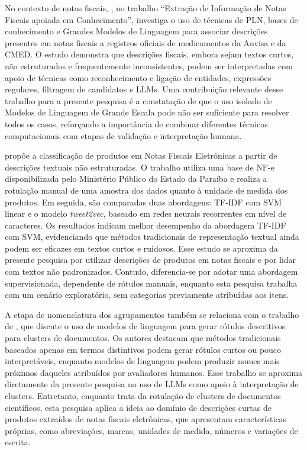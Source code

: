 \documentclass[english,brazilian]{UNISINOSmonografia}
\begin{document}
No contexto de notas fiscais, \cite{martins2025extracao}, no trabalho ``Extração de Informação de Notas Fiscais apoiada em Conhecimento'', investiga o uso de técnicas de PLN, bases de conhecimento e Grandes Modelos de Linguagem para associar descrições presentes em notas fiscais a registros oficiais de medicamentos da Anvisa e da CMED. O estudo demonstra que descrições fiscais, embora sejam textos curtos, não estruturados e frequentemente inconsistentes, podem ser interpretadas com apoio de técnicas como reconhecimento e ligação de entidades, expressões regulares, filtragem de candidatos e LLMs. Uma contribuição relevante desse trabalho para a presente pesquisa é a constatação de que o uso isolado de Modelos de Linguagem de Grande Escala pode não ser suficiente para resolver todos os casos, reforçando a importância de combinar diferentes técnicas computacionais com etapas de validação e interpretação humana.

\cite{santos2023classificacao} propõe a classificação de produtos em Notas Fiscais Eletrônicas a partir de descrições textuais não estruturadas. O trabalho utiliza uma base de NF-e disponibilizada pelo Ministério Público do Estado da Paraíba e realiza a rotulação manual de uma amostra dos dados quanto à unidade de medida dos produtos. Em seguida, são comparadas duas abordagens: TF-IDF com SVM linear e o modelo \textit{tweet2vec}, baseado em redes neurais recorrentes em nível de caracteres. Os resultados indicam melhor desempenho da abordagem TF-IDF com SVM, evidenciando que métodos tradicionais de representação textual ainda podem ser eficazes em textos curtos e ruidosos. Esse estudo se aproxima da presente pesquisa por utilizar descrições de produtos em notas fiscais e por lidar com textos não padronizados. Contudo, diferencia-se por adotar uma abordagem supervisionada, dependente de rótulos manuais, enquanto esta pesquisa trabalha com um cenário exploratório, sem categorias previamente atribuídas aos itens.

A etapa de nomenclatura dos agrupamentos também se relaciona com o trabalho de \cite{murray2025using}, que discute o uso de modelos de linguagem para gerar rótulos descritivos para clusters de documentos. Os autores destacam que métodos tradicionais baseados apenas em termos distintivos podem gerar rótulos curtos ou pouco interpretáveis, enquanto modelos de linguagem podem produzir nomes mais próximos daqueles atribuídos por avaliadores humanos. Esse trabalho se aproxima diretamente da presente pesquisa no uso de LLMs como apoio à interpretação de clusters. Entretanto, enquanto \cite{murray2025using} trata da rotulação de clusters de documentos científicos, esta pesquisa aplica a ideia ao domínio de descrições curtas de produtos extraídos de notas fiscais eletrônicas, que apresentam características próprias, como abreviações, marcas, unidades de medida, números e variações de escrita.
\end{document}
